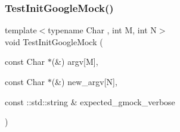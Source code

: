 \mbox{\label{_obj__test_2lib_2googletest-release-1_88_81_2googlemock_2test_2gmock__test_8cc_ac9c8ae8722c330d47f75dee43fb8ab78}} 
\subsubsection{\texorpdfstring{TestInitGoogleMock()}{TestInitGoogleMock()}}
{\footnotesize\ttfamily template$<$typename Char , int M, int N$>$ \\
void Test\+Init\+Google\+Mock (\begin{DoxyParamCaption}\item[{const Char $\ast$(\&)}]{argv\mbox{[}\+M\mbox{]},  }\item[{const Char $\ast$(\&)}]{new\+\_\+argv\mbox{[}\+N\mbox{]},  }\item[{const \+::std\+::string \&}]{expected\+\_\+gmock\+\_\+verbose }\end{DoxyParamCaption})}


